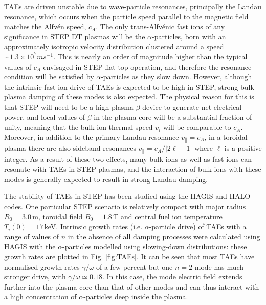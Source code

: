 \documentclass[10pt, a4paper, twoside]{article}
\begin{document}
TAEs are driven unstable due to wave-particle resonances, principally the Landau resonance, which occurs when the particle speed parallel to the magnetic field matches the Alfv\'en speed, $c_A$. The only trans-Alfv\'enic fast ions of any significance in STEP DT plasmas will be the $\alpha$-particles, born with an approximately isotropic velocity distribution clustered around a speed $\sim 1.3\times\si{10^7ms^{-1}}$. This is nearly an order of magnitude higher than the typical values of $c_A$ envisaged in STEP flat-top operation, and therefore the resonance condition will be satisfied by $\alpha$-particles as they slow down. However, although the intrinsic fast ion drive of TAEs is expected to be high in STEP, strong bulk plasma damping of these modes is also expected. The physical reason for this is that STEP will need to be a high plasma $\beta$ device to generate net electrical power, and local values of $\beta$ in the plasma core will be a substantial fraction of unity, meaning that the bulk ion thermal speed $v_i$ will be comparable to $c_A$. Moreover, in addition to the primary Landau resonance $v_{\parallel}=c_A$, in a toroidal plasma there are also sideband resonances $v_{\parallel} = c_A/\vert 2\ell-1 \vert$ where $\ell$ is a positive integer. As a result of these two effects, many bulk ions as well as fast ions can resonate with TAEs in STEP plasmas, and the interaction of bulk ions with these modes is generally expected to result in strong Landau damping.

The stability of TAEs in STEP has been studied using the HAGIS \cite{pinches1998} and HALO \cite{fitzgerald2020} codes. One particular STEP scenario is relatively compact with major radius $R_0 = 3.0\,$m, toroidal field $B_0 = 1.8\,$T and central fuel ion temperature $T_i(0)=17\,$keV. Intrinsic growth rates (i.e. $\alpha$-particle drive) of TAEs with a range of values of $n$ in the absence of all damping processes were calculated using HAGIS with the $\alpha$-particles modelled using slowing-down distributions: these growth rates are plotted in Fig. \ref{fig:TAEs}. It can be seen that most TAEs have normalised growth rates $\gamma/\omega$ of a few percent but one $n=2$ mode has much stronger drive, with $\gamma/\omega \simeq 0.18$. In this case, the mode electric field extends further into the plasma core than that of other modes and can thus interact with a high concentration of $\alpha$-particles deep inside the plasma. 
\end{document}
